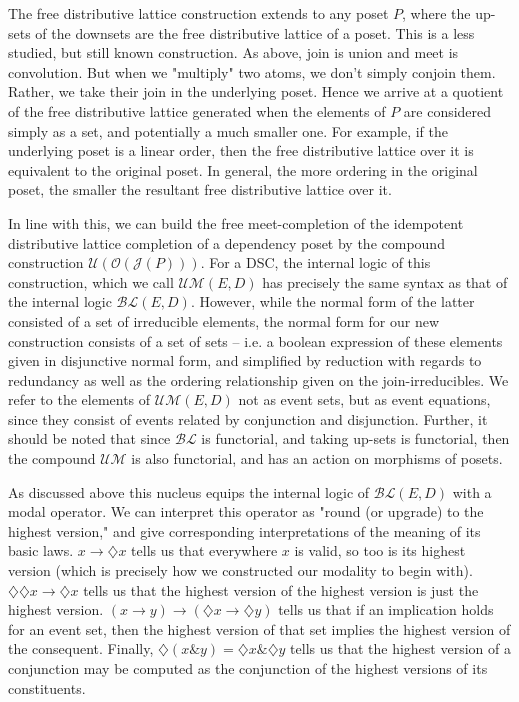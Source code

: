 \documentclass[hoptionsi,review,format=acmsmall]{acmart}
\theoremstyle{definition}
\newcommand{\UMc}{\mathcal{UM}}
\newcommand{\Oc}{\mathcal{O}}
\newcommand{\Ucc}{\mathcal{U}}
\newcommand{\Jc}{\mathcal{J}}
\newcommand{\BLc}{\mathcal{BL}}
\newcommand{\band}{\mathbin{\&}}
\newcommand{\Dia}{\diamondsuit}
\begin{document}
The free distributive lattice construction extends to any poset \(P\), where the up-sets of the downsets are the free distributive lattice of a poset. This is a less studied, but still known construction. As above, join is union and meet is convolution. But when we "multiply" two atoms, we don't simply conjoin them. Rather, we take their join in the underlying poset. Hence we arrive at a quotient of the free distributive lattice generated when the elements of \(P\) are considered simply as a set, and potentially a much smaller one. For example, if the underlying poset is a linear order, then the free distributive lattice over it is equivalent to the original poset. In general, the more ordering in the original poset, the smaller the resultant free distributive lattice over it.

 In line with this, we can build the free meet-completion of the idempotent distributive lattice completion of a dependency poset by the compound construction \(\Ucc(\Oc(\Jc(P)))\). For a DSC, the internal logic of this construction, which we call \(\UMc(E,D)\) has precisely the same syntax as that of the internal logic \(\BLc(E,D)\). However, while the normal form of the latter consisted of a set of irreducible elements, the normal form for our new construction consists of a set of sets -- i.e. a boolean expression of these elements given in disjunctive normal form, and simplified by reduction with regards to redundancy as well as the ordering relationship given on the join-irreducibles. We refer to the elements of \(\UMc(E,D)\) not as event sets, but as event equations, since they consist of events related by conjunction and disjunction. Further, it should be noted that since \(\BLc\) is functorial, and taking up-sets is functorial, then the compound \(\UMc\) is also functorial, and has an action on morphisms of posets.
 


As discussed above this nucleus equips the internal logic of \(\BLc(E,D)\) with a modal operator. We can interpret this operator as "round (or upgrade) to the highest version," and give corresponding interpretations of the meaning of its basic laws. \(x \rightarrow \Dia{x}\) tells us that everywhere \(x\) is valid, so too is its highest version (which is precisely how we constructed our modality to begin with). \(\Dia\Dia{x} \rightarrow \Dia{x}\) tells us that the highest version of the highest version is just the highest version. \((x \rightarrow y) \rightarrow (\Dia{x} \rightarrow \Dia{y})\)  tells us that if an implication holds for an event set, then the highest version of that set implies the highest version of the consequent. Finally, \(\Dia(x \band y) = \Dia{x} \band \Dia{y}\) tells us that the highest version of a conjunction may be computed as the conjunction of the highest versions of its constituents.
\end{document}
